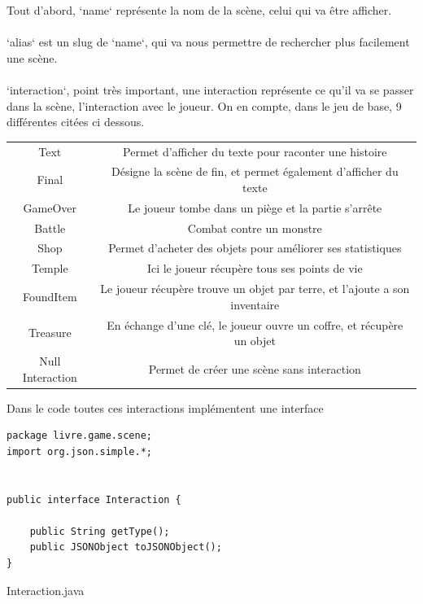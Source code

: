 \documentclass[12pt]{article}
\begin{document}
Tout d'abord, `name` représente la nom de la scène, celui qui va être afficher.\\\\
`alias` est un slug de `name`, qui va nous permettre de rechercher plus facilement une scène.\\\\
`interaction`, point très important, une interaction représente ce qu'il va se passer dans la scène, l'interaction avec le joueur. On en compte, dans le jeu de base, 9 différentes citées ci dessous.

\begin{center}
\begin{tabular}{ c c }

Text & Permet d'afficher du texte pour raconter une histoire\\ 
Final & Désigne la scène de fin, et permet également d'afficher du texte\\  
GameOver & Le joueur tombe dans un piège et la partie s'arrête\\
Battle & Combat contre un monstre\\
Shop & Permet d'acheter des objets pour améliorer ses statistiques\\
Temple & Ici le joueur récupère tous ses points de vie\\
FoundItem & Le joueur récupère trouve un objet par terre, et l'ajoute a son inventaire\\
Treasure & En échange d'une clé, le joueur ouvre un coffre, et récupère un objet\\
Null Interaction & Permet de créer une scène sans interaction\\
\end{tabular}
\end{center}

Dans le code toutes ces interactions implémentent une interface

\begin{listing}[h]
\begin{verbatim}
package livre.game.scene;
import org.json.simple.*;


public interface Interaction {

    public String getType();
    public JSONObject toJSONObject();
}
\end{verbatim}
\caption{Interaction.java} 
\end{listing}
\end{document}
